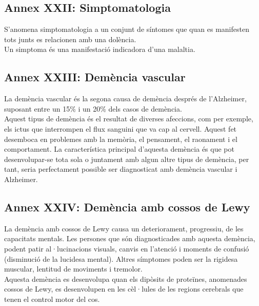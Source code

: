 \documentclass[a4paper,12pt]{article}
\begin{document}
\subsection*{Annex XXII: Simptomatologia}
S'anomena simptomatologia a un conjunt de síntomes que quan es manifesten tots junts es relacionen amb una dolència.\\
Un simptoma és una manifestació indicadora d'una malaltia.
\subsection*{Annex XXIII: Demència vascular}
La demència vascular és la segona causa de demència després de l'Alzheimer, suposant entre un 15\% i un 20\% dels casos de demència.\\
Aquest tipus de demència és el resultat de diverses afeccions, com per exemple, els ictus que interrompen el flux sanguini que va cap al cervell. Aquest fet desemboca en problemes amb la memòria, el pensament, el raonament i el comportament. La característica principal d'aquesta demència és que pot desenvolupar-se tota sola o juntament amb algun altre tipus de demència, per tant, seria perfectament possible ser diagnosticat amb demència vascular i Alzheimer.
\subsection*{Annex XXIV: Demència amb cossos de Lewy}
La demència amb cossos de Lewy causa un deteriorament, progressiu, de les capacitats mentals. Les persones que són diagnosticades amb aquesta demència, podent patir al·lucinacions visuals, canvis en l'atenció i moments de confusió (disminució de la lucidesa mental). Altres símptomes poden ser la rigidesa muscular, lentitud de moviments i tremolor.\\
Aquesta demència es desenvolupa quan els dipòsits de proteïnes, anomenades cossos de Lewy, es desenvolupen en les cèl·lules de les regions cerebrals que tenen el control motor del cos.
\end{document}
